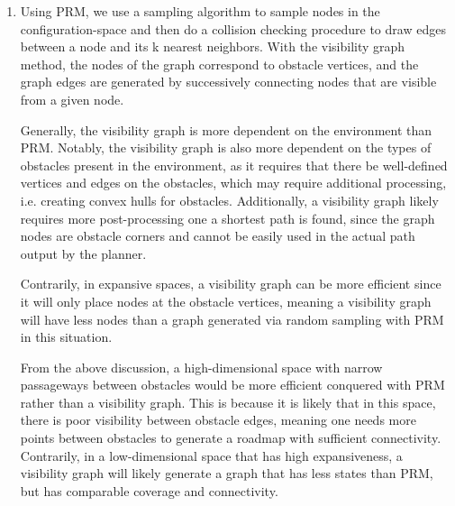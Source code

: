 \documentclass[11pt]{article}
\begin{document}
\begin{enumerate}[leftmargin=0.3in]
   \item %
   \begin{enumerate}
       Using PRM, we use a sampling algorithm to sample nodes in the configuration-space and then do a collision checking procedure to draw edges between a node and its k nearest neighbors. With the visibility graph method, the nodes of the graph correspond to obstacle vertices, and the graph edges are generated by successively connecting nodes that are visible from a given node.
       
       Generally, the visibility graph is more dependent on the environment than PRM. Notably, the visibility graph is also more dependent on the types of obstacles present in the environment, as it requires that there be well-defined vertices and edges on the obstacles, which may require additional processing, i.e. creating convex hulls for obstacles. Additionally, a visibility graph likely requires more post-processing one a shortest path is found, since the graph nodes are obstacle corners and cannot be easily used in the actual path output by the planner.

       Contrarily, in expansive spaces, a visibility graph can be more efficient since it will only place nodes at the obstacle vertices, meaning a visibility graph will have less nodes than a graph generated via random sampling with PRM in this situation. 

       From the above discussion, a high-dimensional space with narrow passageways between obstacles would be more efficient conquered with PRM rather than a visibility graph. This is because it is likely that in this space, there is poor visibility between obstacle edges, meaning one needs more points between obstacles to generate a roadmap with sufficient connectivity. Contrarily, in a low-dimensional space that has high expansiveness, a visibility graph will likely generate a graph that has less states than PRM, but has comparable coverage and connectivity. 
   \end{enumerate} %


\end{enumerate}
\end{document}
